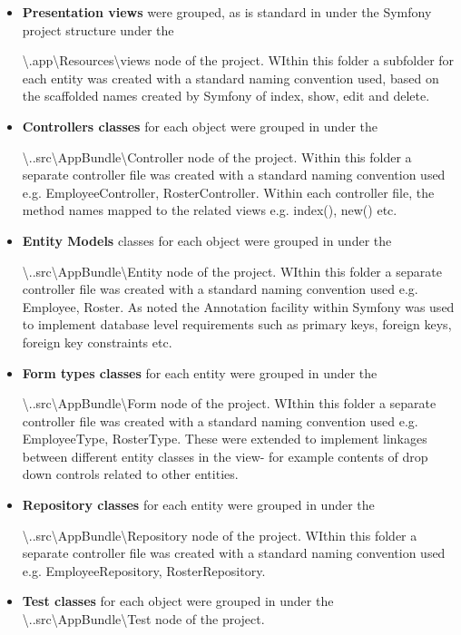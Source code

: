 \documentclass[a4paper,12pt]{article}
\begin{document}
\begin {itemize}
\item \textbf{Presentation views} were grouped, as is standard in under the Symfony project structure under the 

\textbackslash.app\textbackslash Resources\textbackslash views node of the project. WIthin this folder a subfolder for each entity was created with a standard naming convention used, based on the scaffolded names created by Symfony of index, show, edit and delete.
\item \textbf{Controllers classes} for each object were grouped in under the 

\textbackslash..src\textbackslash AppBundle\textbackslash Controller node of the project. Within this folder a separate controller file was created with a standard naming convention used e.g. EmployeeController, RosterController. Within each controller file, the method names mapped to the related views e.g. index(), new() etc.
\item \textbf{Entity Models} classes for each object were grouped in under the 

\textbackslash ..src\textbackslash AppBundle\textbackslash Entity node of the project. WIthin this folder a separate controller file was created with a standard naming convention used e.g. Employee, Roster. As noted the Annotation facility within Symfony was used to implement database level requirements such as primary keys, foreign keys, foreign key constraints etc.
\item \textbf{Form types classes} for each entity were grouped in under the 

\textbackslash ..src\textbackslash AppBundle\textbackslash Form node of the project. WIthin this folder a separate controller file was created with a standard naming convention used e.g. EmployeeType, RosterType. These were extended to implement linkages between different entity classes in the view- for example contents of drop down controls related to other entities.

\item \textbf{Repository classes} for each entity were grouped in under the 

\textbackslash ..src\textbackslash AppBundle\textbackslash Repository node of the project. WIthin this folder a separate controller file was created with a standard naming convention used e.g. EmployeeRepository, RosterRepository. 

\item \textbf{Test classes} for each object were grouped in under the 
\textbackslash..src\textbackslash AppBundle\textbackslash Test node of the project.  


\end{itemize}
\end{document}
